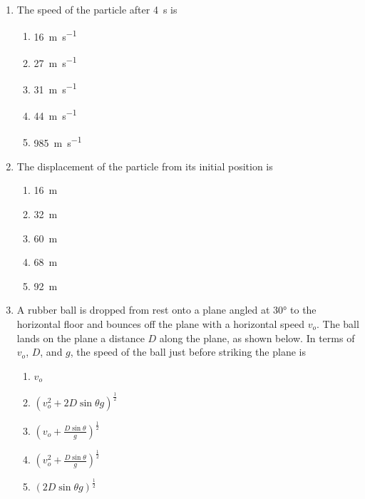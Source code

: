 \documentclass{../../../oss-apphys}
\begin{document}
\begin{multicols}{2}
  \begin{enumerate}[resume,leftmargin=18pt]
  \item The speed of the particle after \SI{4}{\second} is
    \begin{enumerate}[noitemsep,topsep=0pt,leftmargin=18pt,label=(\Alph*)]
    \item\SI{16 }{\metre\per\second}
    \item\SI{27 }{\metre\per\second}
    \item\SI{31 }{\metre\per\second}
    \item\SI{44 }{\metre\per\second}
    \item\SI{985}{\metre\per\second}
    \end{enumerate}
    \label{q:particle1}
    
  \item The displacement of the particle from its initial position is
    \begin{enumerate}[noitemsep,topsep=0pt,leftmargin=18pt,label=(\Alph*)]
    \item\SI{16}{\metre}
    \item\SI{32}{\metre}
    \item\SI{60}{\metre}
    \item\SI{68}{\metre}
    \item\SI{92}{\metre}
    \end{enumerate}
    \label{q:particle2}
    
%
    
  \item A rubber ball is dropped from rest onto a plane angled at \ang{30} to
    the horizontal floor and bounces off the plane with a horizontal speed
    $v_o$. The ball lands on the plane a distance $D$ along the plane, as shown
    below. In terms of $v_o$, $D$, and $g$, the speed of the ball just before
    striking the plane is
    \begin{center}
    \end{center}
    \begin{enumerate}[noitemsep,topsep=0pt,leftmargin=18pt,label=(\Alph*)]
    \item $v_o$
    \item $\displaystyle\left(v_o^2+2D\sin\theta g\right)^\frac{1}{2}$
    \item $\displaystyle\left(v_o+\frac{D\sin\theta}{g}\right)^\frac{1}{2}$
    \item $\displaystyle\left(v_o^2+\frac{D\sin\theta}{g}\right)^\frac{1}{2}$
    \item $\displaystyle\left(2D\sin\theta g\right)^\frac{1}{2}$
    \end{enumerate}
    \columnbreak
    

\end{enumerate}
\end{multicols}
\end{document}

